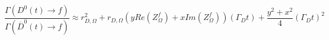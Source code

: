 \documentclass[preview, convert={density=300,size=1080x800,outext=.png}]{standalone}
\begin{document}
\begin{equation*}
    \frac{\Gamma(D^0(t) \rightarrow f)}{\Gamma (\overline{D}^0(t) \rightarrow f)}
    \approx  r_{D,\Omega}^2
    + r_{D,\Omega} \left( yRe(Z_\Omega^f) + xIm(Z_\Omega^f)\right)(\Gamma_Dt)
    + \frac{y^2 + x^2}{4} (\Gamma_Dt)^2
\end{equation*}
\end{document}
